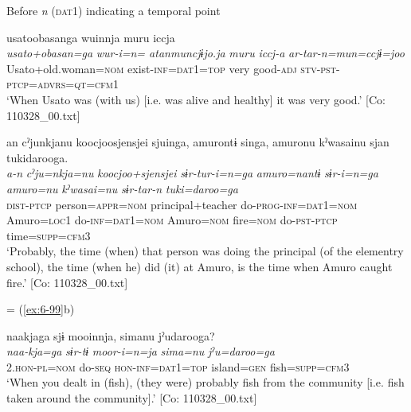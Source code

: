 \ea\label{ex:8-115}
  Before \textit{n} (\textsc{dat1}) indicating a temporal point

\ea
{\TM}
\glll  usatoobasanga  wuinnja  muru  iccja\\
\textit{usato+obasan=ga}  \textit{wur-i=n=   atanmuncjɨjo.ja}  \textit{muru}  \textit{iccj-a}      \textit{ar-tar-n=mun=ccjɨ=joo}\\
Usato+old.woman=\textsc{nom}  exist-\textsc{inf}=\textsc{dat1}=\textsc{top}  very  good-\textsc{adj} \textsc{stv}-\textsc{pst}-\textsc{ptcp}=\textsc{advrs}=\textsc{qt}=\textsc{cfm1}\\
\glt ‘When Usato was (with us) [i.e. was alive and healthy] it was very good.’ [Co: 110328\_00.txt]

\ex
{\TM}
\glll  an  cˀjunkjanu  {\textbar}koocjoosjensjei{\textbar}      sjuinga,  amurontɨ  singa,      amuronu  kˀwasainu  sjan  tukidarooga.\\
\textit{a-n}  \textit{cˀju=nkja=nu}  \textit{koocjoo+sjensjei}     \textit{sɨr-tur-i=n=ga}  \textit{amuro=nantɨ}  \textit{sɨr-i=n=ga}      \textit{amuro=nu}  \textit{kˀwasai=nu}  \textit{sɨr-tar-n}  \textit{tuki=daroo=ga}\\
\textsc{dist}-\textsc{ptcp}  person=\textsc{appr}=\textsc{nom}  principal+teacher   do-\textsc{prog}-\textsc{inf}=\textsc{dat1}=\textsc{nom}  Amuro=\textsc{loc}1  do-\textsc{inf}=\textsc{dat1}=\textsc{nom}  Amuro=\textsc{nom}  fire=\textsc{nom}  do-\textsc{pst}-\textsc{ptcp}  time=\textsc{supp}=\textsc{cfm3}\\
\glt ‘Probably, the time (when) that person was doing the principal (of the elementry school), the time (when he) did (it) at Amuro, is the time when Amuro caught fire.’ [Co: 110328\_00.txt]

 = (\ref{ex:6-99}b)

{\TM}
\glll  naakjaga  sjɨ  mooinnja,  simanu   jˀudarooga?
\\
\textit{naa-kja=ga}  \textit{sɨr-tɨ}  \textit{moor-i=n=ja}  \textit{sima=nu}      \textit{jˀu=daroo=ga}\\
2.\textsc{hon}-\textsc{pl}=\textsc{nom}  do-\textsc{seq}  \textsc{hon}-\textsc{inf}=\textsc{dat1}=\textsc{top}  island=\textsc{gen}   fish=\textsc{supp}=\textsc{cfm3}\\
\glt ‘When you dealt in (fish), (they were) probably fish from the community [i.e. fish taken around the community].’ [Co: 110328\_00.txt]

\ex [= \REF{ex:6-56}]

